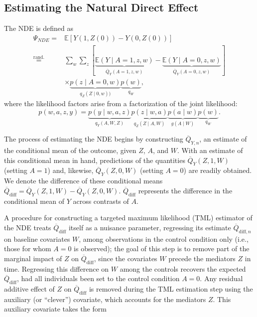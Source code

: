 \documentclass[
  12pt, krantz2,
]{krantz}
\newcommand{\E}{\mathbb{E}}
\newcommand{\1}{\mathbbm{1}}
\theoremstyle{definition}
\theoremstyle{definition}
\theoremstyle{definition}
\theoremstyle{definition}
\theoremstyle{remark}
\begin{document}
\hypertarget{estimating-the-natural-direct-effect}{%
\subsection{Estimating the Natural Direct Effect}\label{estimating-the-natural-direct-effect}}

The NDE is defined as
\begin{align*}
  \Psi_{NDE} =& \E[Y(1, Z(0)) - Y(0, Z(0))] \\
  \overset{\text{rand.}}{=}& \sum_w \sum_z
  [\underbrace{\E(Y \mid A = 1, z, w)}_{\overline{Q}_Y(A = 1, z, w)} -
  \underbrace{\E(Y \mid A = 0, z, w)}_{\overline{Q}_Y(A = 0, z, w)}] \\&\times
  \underbrace{p(z \mid A = 0, w)}_{q_Z(Z \mid 0, w))}
  \underbrace{p(w)}_{q_W},
\end{align*}
where the likelihood factors arise from a factorization of the joint
likelihood:
\begin{equation*}
  p(w, a, z, y) = \underbrace{p(y \mid w, a, z)}_{q_Y(A, W, Z)}
  \underbrace{p(z \mid w, a)}_{q_Z(Z \mid A, W)}
  \underbrace{p(a \mid w)}_{g(A \mid W)}
  \underbrace{p(w)}_{q_W}.
\end{equation*}

The process of estimating the NDE begins by constructing \(\overline{Q}_{Y, n}\),
an estimate of the conditional mean of the outcome, given \(Z\), \(A\), and \(W\).
With an estimate of this conditional mean in hand, predictions of the
quantities \(\overline{Q}_Y(Z, 1, W)\) (setting \(A = 1\)) and,
likewise, \(\overline{Q}_Y(Z, 0, W)\) (setting \(A = 0\)) are readily obtained. We
denote the difference of these conditional means \(\overline{Q}_{\text{diff}} = \overline{Q}_Y(Z, 1, W) - \overline{Q}_Y(Z, 0, W)\).
\(\overline{Q}_{\text{diff}}\) represents the difference in the conditional mean
of \(Y\) across contrasts of \(A\).

A procedure for constructing a targeted maximum likelihood (TML) estimator of
the NDE treats \(\overline{Q}_{\text{diff}}\) itself as a nuisance parameter,
regressing its estimate \(\overline{Q}_{\text{diff}, n}\) on baseline covariates
\(W\), among observations in the control condition only (i.e., those for whom \(A = 0\) is observed); the goal of this step is to remove part of the marginal impact
of \(Z\) on \(\overline{Q}_{\text{diff}}\), since the covariates \(W\) precede the
mediators \(Z\) in time. Regressing this difference on \(W\) among the controls
recovers the expected \(\overline{Q}_{\text{diff}}\), had all individuals been set
to the control condition \(A = 0\). Any residual additive effect of \(Z\) on
\(\overline{Q}_{\text{diff}}\) is removed during the TML estimation step using the
auxiliary (or ``clever'') covariate, which accounts for the mediators \(Z\). This
auxiliary covariate takes the form
\end{document}
